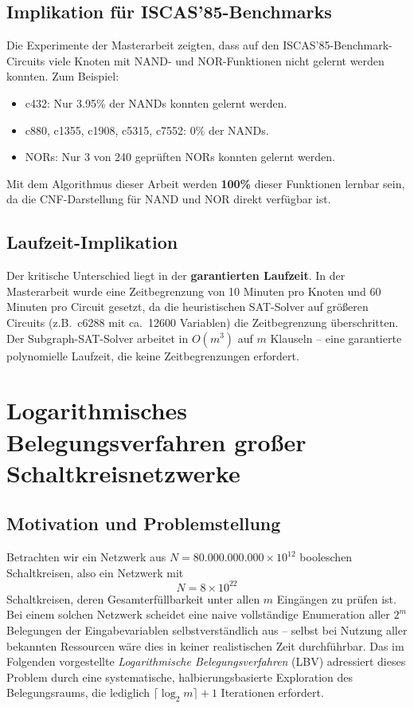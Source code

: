 ﻿\documentclass[a4paper,12pt]{article}
\theoremstyle{definition}
\begin{document}
\subsection{Implikation für ISCAS'85-Benchmarks}

Die Experimente der Masterarbeit zeigten, dass auf den ISCAS'85-Benchmark-Circuits viele Knoten mit NAND- und NOR-Funktionen nicht gelernt werden konnten. Zum Beispiel:
\begin{itemize}
    \item[-] c432: Nur 3.95\% der NANDs konnten gelernt werden.
    \item[-] c880, c1355, c1908, c5315, c7552: 0\% der NANDs.
    \item[-] NORs: Nur 3 von 240 geprüften NORs konnten gelernt werden.
\end{itemize}

Mit dem Algorithmus dieser Arbeit werden \textbf{100\%} dieser Funktionen lernbar sein, da die CNF-Darstellung für NAND und NOR direkt verfügbar ist.

\subsection{Laufzeit-Implikation}

Der kritische Unterschied liegt in der \textbf{garantierten Laufzeit}. In der Masterarbeit wurde eine Zeitbegrenzung von 10 Minuten pro Knoten und 60 Minuten pro Circuit gesetzt, da die heuristischen SAT-Solver auf größeren Circuits (z.B.\ c6288 mit ca.\ 12600 Variablen) die Zeitbegrenzung überschritten. Der Subgraph-SAT-Solver arbeitet in $O(m^3)$ auf $m$ Klauseln -- eine garantierte polynomielle Laufzeit, die keine Zeitbegrenzungen erfordert.

\section{Logarithmisches Belegungsverfahren großer Schaltkreisnetzwerke}
\label{sec:log-verfahren}

\subsection{Motivation und Problemstellung}

Betrachten wir ein Netzwerk aus $N = 80.000.000.000 \times 10^{12}$ booleschen Schaltkreisen,
also ein Netzwerk mit
\[
N = 8 \times 10^{22}
\]
Schaltkreisen, deren Gesamterfüllbarkeit unter allen $m$ Eingängen zu prüfen ist. Bei einem
solchen Netzwerk scheidet eine naive vollständige Enumeration aller $2^m$ Belegungen der
Eingabevariablen selbstverständlich aus -- selbst bei Nutzung aller bekannten
Ressourcen wäre dies in keiner realistischen Zeit durchführbar. Das im Folgenden vorgestellte
\textit{Logarithmische Belegungsverfahren} (LBV) adressiert dieses Problem durch eine
systematische, halbierungsbasierte Exploration des Belegungsraums, die lediglich
$\lceil \log_2 m \rceil + 1$ Iterationen erfordert.
\end{document}
